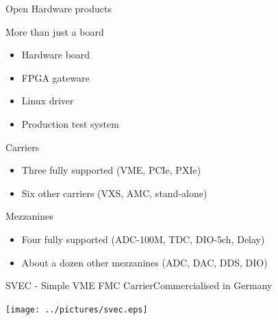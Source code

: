 \documentclass[compress,red]{beamer}
\begin{document}
\begin{frame}{Open Hardware products}

  \begin{block}{More than just a board}
    \begin{itemize}
    \item Hardware board
    \item FPGA gateware
    \item Linux driver
    \item Production test system
    \end{itemize}
  \end{block}

  \begin{block}{Carriers}
    \begin{itemize}
    \item Three fully supported (VME, PCIe, PXIe)
    \item Six other carriers (VXS, AMC, stand-alone)
    \end{itemize}
  \end{block}


  \begin{block}{Mezzanines}
    \begin{itemize}
    \item Four fully supported (ADC-100M, TDC, DIO-5ch, Delay)
    \item About a dozen other mezzanines (ADC, DAC, DDS, DIO)
    \end{itemize}
  \end{block}


  \note[item]{}

\end{frame}

\begin{frame}{SVEC - Simple VME FMC Carrier}{Commercialised in Germany}

  \begin{center}
    \texttt{[image: ../pictures/svec.eps]}
  \end{center}

  \note[item]{}

\end{frame}
\end{document}
